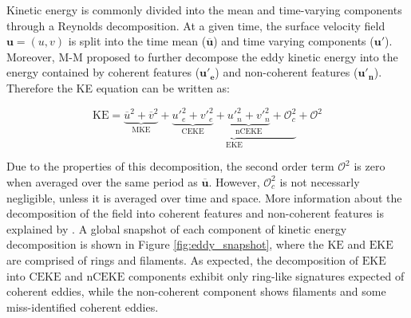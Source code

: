 \documentclass[draft,linenumbers]{agujournal2019}
\newcommand{\mKE}{\textrm{MKE}}
\newcommand{\KE}{\textrm{KE}}
\newcommand{\EKE}{\textrm{EKE}}
\newcommand{\CEKE}{\textrm{CEKE}}
\newcommand{\nCEKE}{\textrm{nCEKE}}
\begin{document}
	Kinetic energy is commonly divided into the mean and time-varying components through a Reynolds decomposition. At a given time, the surface velocity field $\mathbf{u} = (u,v)$ is split into the time mean ($\mathbf{\overline{u}}$) and time varying components ($\mathbf{u'}$). Moreover, M-M proposed to further decompose the eddy kinetic energy into the energy contained by coherent features ($\mathbf{u'_e}$) and non-coherent features ($\mathbf{u'_n}$). Therefore the KE equation can be written as:
	
	\begin{equation}
		\mathrm{KE} = \underbrace{\overline{u}^2 + \overline{v}^2}_{\mKE} + 
		\underbrace{\underbrace{{u'}_e^2+{v'}_e^2}_{\CEKE}  + \underbrace{{u'}_n^2+{v'}_n^2}_{\nCEKE} + \mathcal{O}_c^2 }_{\EKE} + \mathcal{O}^2
	\end{equation}

	Due to the properties of this decomposition, the second order term $\mathcal{O}^2$ is zero when averaged over the same period as $\mathbf{\overline{u}}$. However, $\mathcal{O}_c^2$ is not necessarly negligible, unless it is averaged over time and space. More information about the decomposition of the field into coherent features and non-coherent features is explained by \citet{Martinez_TKE_2019}. A global snapshot of each component of kinetic energy decomposition is shown in Figure \ref{fig:eddy_snapshot}, where the $\KE$ and $\EKE$ are comprised of rings and filaments. As expected, the decomposition of $\EKE$ into $\CEKE$ and $\nCEKE$ components exhibit only ring-like signatures expected of coherent eddies, while the non-coherent component shows filaments and some miss-identified coherent eddies.
\end{document}
